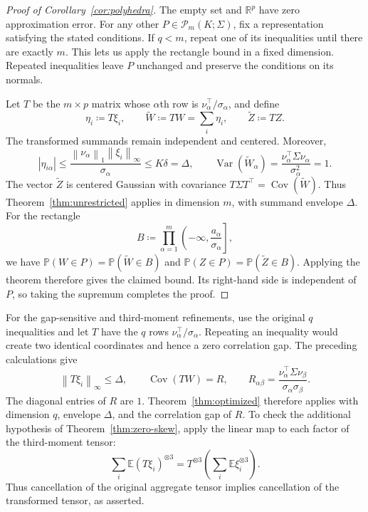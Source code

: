 \documentclass[11pt,letterpaper]{article}
\theoremstyle{remark}
\newcommand{\E}{\mathbb E}
\newcommand{\Pp}{\mathbb P}
\newcommand{\R}{\mathbb R}
\newcommand{\Cov}{\operatorname{Cov}}
\newcommand{\Var}{\operatorname{Var}}
\newcommand{\norm}[1]{\left\lVert#1\right\rVert}
\begin{document}
\begin{proof}[Proof of Corollary~\ref{cor:polyhedra}]
The empty set and \(\R^p\) have zero approximation error. For any
other \(P\in\mathcal P_m(K;\Sigma)\), fix a representation satisfying
the stated conditions. If \(q<m\), repeat one of its inequalities
until there are exactly \(m\). This lets us apply the rectangle
bound in a fixed dimension. Repeated inequalities leave \(P\)
unchanged and preserve the conditions on its normals.

Let \(T\) be the \(m\times p\) matrix whose \(\alpha\)th row is
\(\nu_\alpha^\top/\sigma_\alpha\), and define
\[
 \eta_i\coloneqq T\xi_i,\qquad
 \widetilde W\coloneqq TW=\sum_i\eta_i,\qquad
 \widetilde Z\coloneqq TZ.
\]
The transformed summands remain independent and centered. Moreover,
\[
 |\eta_{i\alpha}|
 \le\frac{\norm{\nu_\alpha}_1\norm{\xi_i}_\infty}{\sigma_\alpha}
 \le K\delta=\Delta,
 \qquad
 \Var(\widetilde W_\alpha)
 =\frac{\nu_\alpha^\top\Sigma\nu_\alpha}{\sigma_\alpha^2}=1.
\]
The vector \(\widetilde Z\) is centered Gaussian with covariance
\(T\Sigma T^\top=\Cov(\widetilde W)\). Thus
Theorem~\ref{thm:unrestricted} applies in dimension \(m\), with
summand envelope \(\Delta\). For the rectangle
\[
 B\coloneqq\prod_{\alpha=1}^m
 \left(-\infty,\frac{a_\alpha}{\sigma_\alpha}\right],
\]
we have \(\Pp(W\in P)=\Pp(\widetilde W\in B)\) and
\(\Pp(Z\in P)=\Pp(\widetilde Z\in B)\). Applying the theorem
therefore gives the claimed bound. Its right-hand side is independent
of \(P\), so taking the supremum completes the proof.
\end{proof}

For the gap-sensitive and third-moment refinements, use the original
\(q\) inequalities and let \(T\) have the \(q\) rows
\(\nu_\alpha^\top/\sigma_\alpha\). Repeating an inequality would
create two identical coordinates and hence a zero correlation gap.
The preceding calculations give
\[
 \norm{T\xi_i}_\infty\le\Delta,\qquad
 \Cov(TW)=R,\qquad
 R_{\alpha\beta}
 =\frac{\nu_\alpha^\top\Sigma\nu_\beta}
       {\sigma_\alpha\sigma_\beta}.
\]
The diagonal entries of \(R\) are \(1\). Theorem~\ref{thm:optimized}
therefore applies with dimension \(q\), envelope \(\Delta\), and
the correlation gap of \(R\). To check the additional hypothesis
of Theorem~\ref{thm:zero-skew}, apply the linear map to each factor
of the third-moment tensor:
\[
 \sum_i\E(T\xi_i)^{\otimes3}
 =T^{\otimes3}\left(\sum_i\E\xi_i^{\otimes3}\right).
\]
Thus cancellation of the original aggregate tensor implies
cancellation of the transformed tensor, as asserted.
\end{document}
